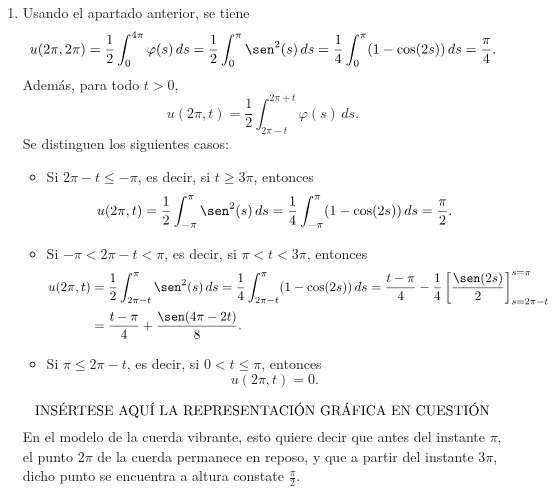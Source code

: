 \documentclass[a4paper, 12pt, extrafontsizes]{memoir}
\begin{document}
\begin{solution}
\begin{enumerate}
    En consecuencia, por la fórmula de D'Alembert, la única solución del problema es la función $u \colon \R \times [0,\infty) \to \R$ dada por
    \[u(x,t) = \frac{1}{2c}\int_{x-ct}^{x+ct} \varphi(s) \, ds.\]
    Como $u$ es solución de un problema inicial asociado a la ecuación de ondas, se tiene que $u \in \mathcal{C}^2(\R \times (0,\infty)) \cap \mathcal{C}^{0,1}(\R \times[0,\infty))$ (esto último quiere decir que $u$ es continua respecto de $x$ y de clase $1$ respecto de $t$ en $\R \times [0,\infty)$). De hecho, como $u_0 \equiv 0 \in \mathcal{C}^2(\R)$ y $u_1 \equiv \varphi \in \mathcal{C}^1(\R)$, entonces $u \in \mathcal{C}^2(\R \times [0,\infty))$.
    \item Usando el apartado anterior, se tiene
    \[u(2\pi,2\pi) = \frac{1}{2}\int_0^{4\pi}\varphi(s) \, ds = \frac{1}{2}\int_0^{\pi}\sen^2(s) \, ds = \frac{1}{4}\int_0^{\pi}(1-\cos(2s)) \, ds = \frac{\pi}{4}.\]
    Además, para todo $t > 0$,
    \[u(2\pi,t) = \frac{1}{2}\int_{2\pi-t}^{2\pi+t} \varphi(s) \, ds.\]
    Se distinguen los siguientes casos:
    \begin{itemize}
        \item Si $2\pi-t \leq -\pi$, es decir, si $t \geq 3\pi$, entonces
        \[u(2\pi,t) = \frac{1}{2}\int_{-\pi}^\pi \sen^2(s) \, ds = \frac{1}{4}\int_{-\pi}^\pi (1-\cos(2s)) \, ds = \frac{\pi}{2}.\]
        \item Si $-\pi < 2\pi-t < \pi$, es decir, si $\pi < t < 3\pi$, entonces
        \[\begin{aligned}[t]
            u(2\pi,t) &= \frac{1}{2}\int_{2\pi-t}^\pi \sen^2(s) \, ds = \frac{1}{4}\int_{2\pi-t}^\pi (1-\cos(2s)) \, ds = \frac{t-\pi}{4}-\frac{1}{4}\left[\frac{\sen(2s)}{2}\right]_{s=2\pi-t}^{s=\pi} \\
            &= \frac{t-\pi}{4} +\frac{\sen(4\pi-2t)}{8}.
        \end{aligned}\]
        \item Si $\pi \leq 2\pi -t$, es decir, si $0 < t \leq \pi$, entonces 
        \[u(2\pi,t) = 0.\]
    \end{itemize}
    \[\textup{INSÉRTESE AQUÍ LA REPRESENTACIÓN GRÁFICA EN CUESTIÓN}\]
    En el modelo de la cuerda vibrante, esto quiere decir que antes del instante $\pi$, el punto $2\pi$ de la cuerda permanece en reposo, y que a partir del instante $3\pi$, dicho punto se encuentra a altura constate $\frac{\pi}{2}$.
\end{enumerate}
\end{solution}
\end{document}
